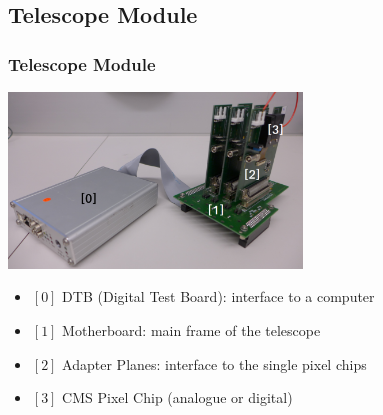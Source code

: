 \documentclass[9pt]{beamer}
\begin{document}
\subsection{Telescope Module}
\begin{frame}
	\frametitle{Telescope Module}
	\begin{center}
		\includegraphics[width=7.8cm]{Pics/setup}
	\end{center}
	\begin{itemize}
		\item $[0]$ DTB (Digital Test Board): interface to a computer
		\item $[1]$ Motherboard: main frame of the telescope
		\item $[2]$ Adapter Planes: interface to the single pixel chips
		\item $[3]$ CMS Pixel Chip (analogue or digital)
	\end{itemize}
\end{frame}
\end{document}
